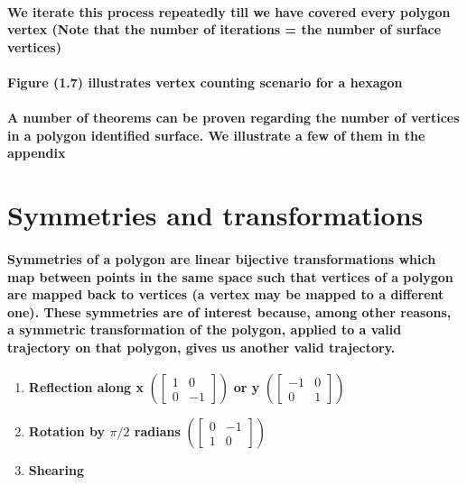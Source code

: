 \documentclass{article}
\begin{document}
\paragraph{We iterate this process repeatedly till we have covered every polygon vertex (Note that the number of iterations = the number of surface vertices)}

\paragraph{Figure (1.7) illustrates vertex counting scenario for a hexagon}


\paragraph{A number of theorems can be proven regarding the number of vertices in a polygon identified surface. We illustrate a few of them in the appendix}


\section{Symmetries and transformations}

\paragraph{Symmetries of a polygon are linear bijective transformations which map between points in the same space such that vertices of a polygon are mapped back to vertices (a vertex may be mapped to a different one). 
These symmetries are of interest because, among other reasons, a symmetric transformation of the polygon, applied to a valid trajectory on that polygon, gives us another valid trajectory.}

\begin{enumerate}

\item \textbf{Reflection along x} 
$ (\begin{bmatrix}
1&0\\0&-1
\end{bmatrix})$
\textbf{or y}
$ (\begin{bmatrix}
-1&0\\0&1
\end{bmatrix})$

\item \textbf{Rotation by $\pi/2$ radians}
$ (\begin{bmatrix}
0&-1\\1&0
\end{bmatrix})$

\item \textbf{Shearing}


\end{enumerate}
\end{document}
